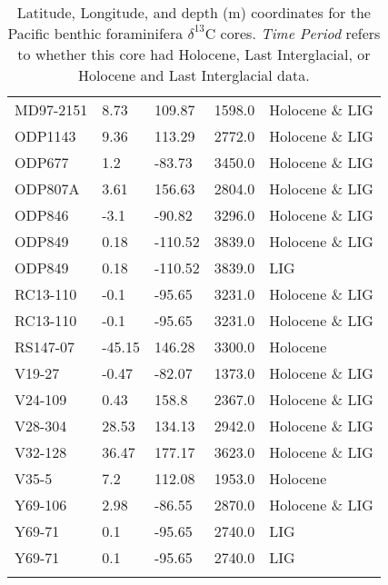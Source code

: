 \begin{longtable}{lllrl}
  MD97-2151 &     8.73 &    109.87 &     1598.0 &  Holocene \& LIG \\
    ODP1143 &     9.36 &    113.29 &     2772.0 &  Holocene \& LIG \\
     ODP677 &      1.2 &    -83.73 &     3450.0 &  Holocene \& LIG \\
    ODP807A &     3.61 &    156.63 &     2804.0 &  Holocene \& LIG \\
     ODP846 &     -3.1 &    -90.82 &     3296.0 &  Holocene \& LIG \\
     ODP849 &     0.18 &   -110.52 &     3839.0 &  Holocene \& LIG \\
     ODP849 &     0.18 &   -110.52 &     3839.0 &             LIG \\
   RC13-110 &     -0.1 &    -95.65 &     3231.0 &  Holocene \& LIG \\
   RC13-110 &     -0.1 &    -95.65 &     3231.0 &  Holocene \& LIG \\
   RS147-07 &   -45.15 &    146.28 &     3300.0 &        Holocene \\
     V19-27 &    -0.47 &    -82.07 &     1373.0 &  Holocene \& LIG \\
    V24-109 &     0.43 &     158.8 &     2367.0 &  Holocene \& LIG \\
    V28-304 &    28.53 &    134.13 &     2942.0 &  Holocene \& LIG \\
    V32-128 &    36.47 &    177.17 &     3623.0 &  Holocene \& LIG \\
      V35-5 &      7.2 &    112.08 &     1953.0 &        Holocene \\
    Y69-106 &     2.98 &    -86.55 &     2870.0 &  Holocene \& LIG \\
     Y69-71 &      0.1 &    -95.65 &     2740.0 &             LIG \\
     Y69-71 &      0.1 &    -95.65 &     2740.0 &             LIG \\
\caption{Latitude, Longitude, and depth (m) coordinates for the Pacific benthic foraminifera $\delta^{13}$C cores. \textit{Time Period} refers to whether this core had Holocene, Last Interglacial, or Holocene and Last Interglacial data.}\end{longtable}
